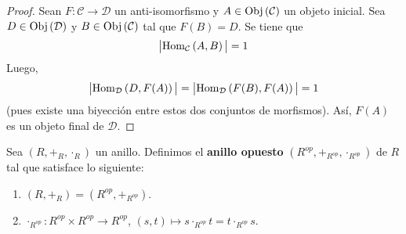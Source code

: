 \documentclass[12pt]{report}
\theoremstyle{largebreak}
\newcommand\abs[1]{\ensuremath{\big|#1\big|}}
\newcommand\cf[3]{\ensuremath{#1:#2\rightarrow#3}}
\newcommand{\Obj}[1]{\ensuremath{\textup{Obj}\left(#1\right)}}
\newcommand{\Hom}[3]{\ensuremath{\textup{Hom}_{#1}\left(#2,#3\right)}}
\begin{document}
    \begin{proof}
        Sean $\cf{F}{\mathcal{C}}{\mathcal{D}}$ un anti-isomorfismo y $A\in\Obj{\mathcal{C}}$ un objeto inicial. Sea $D\in\Obj{\mathcal{D}}$ y $B\in\Obj{\mathcal{C}}$ tal que $F(B)=D$. Se tiene que
        \begin{equation*}
            \abs{\Hom{\mathcal{C}}{A}{B}}=1
        \end{equation*}
        Luego,
        \begin{equation*}
            \abs{\Hom{\mathcal{D}}{D}{F(A)}}=\abs{\Hom{\mathcal{D}}{F(B)}{F(A)}}=1
        \end{equation*}
        (pues existe una biyección entre estos dos conjuntos de morfismos). Así, $F(A)$ es un objeto final de $\mathcal{D}$.
    \end{proof}

    \begin{mydef}
        Sea $(R,+_R,\cdot_R)$ un anillo. Definimos el \textbf{anillo opuesto} $(R^{op},+_{ R^{op}},\cdot_{ R^{op}})$ de $R$ tal que satisface lo siguiente:
        \begin{enumerate}
            \item $(R,+_R)=(R^{op},+_{R^{op}})$.
            \item $\cf{\cdot_{R^{op}}}{R^{op}\times R^{op}}{R^{op}}$, $(s,t)\mapsto s\cdot_{R^{op}}t=t\cdot_{R^{op}}s$.
        \end{enumerate}
    \end{mydef}
\end{document}

